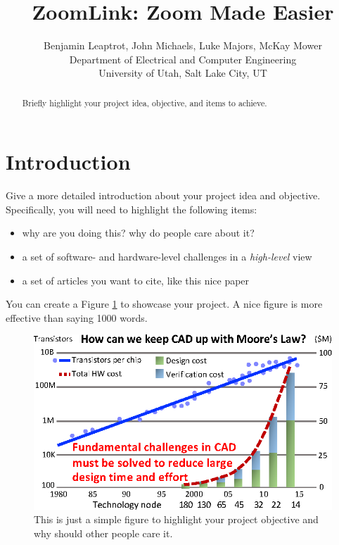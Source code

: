 \documentclass[conference, final]{IEEEtran}
\begin{document}
\title{ZoomLink: Zoom Made Easier}

\author{
    Benjamin Leaptrot, John Michaels, Luke Majors, McKay Mower\\
    Department of Electrical and Computer Engineering\\
    University of Utah, Salt Lake City, UT\\
}

\date{}
\maketitle

\thispagestyle{empty}

\begin{abstract}
Briefly highlight your project idea, objective, and items to achieve.
\end{abstract}

\section{Introduction}

Give a more detailed introduction about your project idea and objective.
Specifically, you will need to highlight the following items:

\begin{itemize}

\item why are you doing this? why do people care about it?
\item a set of software- and hardware-level challenges in a \textit{high-level} view
\item a set of articles you want to cite, like this nice paper~\cite{nicepaper1}

\end{itemize}

You can create a Figure \ref{fig::intro} to showcase your project.
A nice figure is more effective than saying 1000 words.

\begin{figure}[h]
  \centering
  \centerline{\includegraphics[width=1.\columnwidth]{Fig/intro.eps}}
  \caption{This is just a simple figure to highlight your project objective and why 
  should other people care it.}
  \label{fig::intro}
\end{figure}
\end{document}
